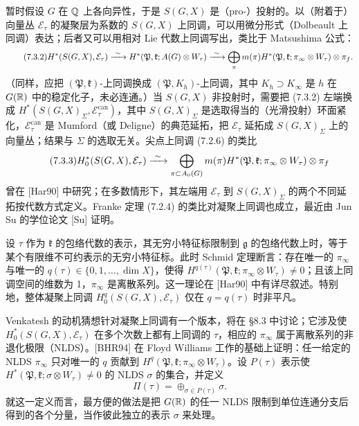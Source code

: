 暂时假设 $G$ 在 $\mathbb{Q}$ 上各向异性，于是 $S(G,X)$ 是（pro-）投射的。以（附着于）向量丛 $\mathcal E_\tau$ 的凝聚层为系数的 $S(G,X)$ 上同调，可以用微分形式（Dolbeault 上同调）表达；后者又可以用相对 Lie 代数上同调写出，类比于 Matsushima 公式：
\begin{equation}\tag{7.3.2}\label{eq:a6-05-2}
H^*(S(G,X),\mathcal E_\tau)\xrightarrow{\ \sim\ } H^*(\mathfrak P,\mathfrak k;A(G)\otimes W_\tau)\xrightarrow{\ \sim\ }\bigoplus_\pi m(\pi)H^*(\mathfrak P,\mathfrak k;\pi_\infty\otimes W_\tau)\otimes\pi_f.
\end{equation}
（同样，应把 $(\mathfrak P,\mathfrak k)$-上同调换成 $(\mathfrak P,K_h)$-上同调，其中 $K_h\supset K_\infty$ 是 $h$ 在 $G(\mathbb{R})$ 中的稳定化子，未必连通。）当 $S(G,X)$ 非投射时，需要把 (7.3.2) 左端换成 $H^*(S(G,X)_\Sigma,\mathcal E_\tau^{\mathrm{can}})$，其中 $S(G,X)_\Sigma$ 是选取得当的（光滑投射）环面紧化，$\mathcal E_\tau^{\mathrm{can}}$ 是 Mumford（或 Deligne）的典范延拓，把 $\mathcal E_\tau$ 延拓成 $S(G,X)_\Sigma$ 上的向量丛；结果与 $\Sigma$ 的选取无关。尖点上同调 (7.2.6) 的类比
\begin{equation}\tag{7.3.3}\label{eq:a6-05-3}
H^*_0(S(G,X),\mathcal E_\tau)\xrightarrow{\ \sim\ }\bigoplus_{\pi\subset A_0(G)}m(\pi)H^*(\mathfrak P,\mathfrak k;\pi_\infty\otimes W_\tau)\otimes\pi_f
\end{equation}
曾在 [Har90] 中研究；在多数情形下，其左端用 $\mathcal E_\tau$ 到 $S(G,X)_\Sigma$ 的两个不同延拓按代数方式定义。Franke 定理 (7.2.4) 的类比对凝聚上同调也成立，最近由 Jun Su 的学位论文 [Su] 证明。

设 $\tau$ 作为 $\mathfrak k$ 的包络代数的表示，其无穷小特征标限制到 $\mathfrak g$ 的包络代数上时，等于某个有限维不可约表示的无穷小特征标。此时 Schmid 定理断言：存在唯一的 $\pi_\infty$ 与唯一的 $q(\tau)\in\{0,1,\dots,\dim X\}$，使得 $H^{q(\tau)}(\mathfrak P,\mathfrak k;\pi_\infty\otimes W_\tau)\ne0$；且该上同调空间的维数为 1，$\pi_\infty$ 是离散系列。这一理论在 [Har90] 中有详尽叙述。特别地，整体凝聚上同调 $H^q_0(S(G,X),\mathcal E_\tau)$ 仅在 $q=q(\tau)$ 时非平凡。

Venkatesh 的动机猜想针对凝聚上同调有一个版本，将在 §8.3 中讨论；它涉及使 $H^*_0(S(G,X),\mathcal E_\tau)$ 在多个次数上都有上同调的 $\tau$，相应的 $\pi_\infty$ 属于离散系列的非退化极限（NLDS）。[BHR94] 在 Floyd Williams 工作的基础上证明：任一给定的 NLDS $\pi_\infty$ 只对唯一的 $q$ 贡献到 $H^q(\mathfrak P,\mathfrak k;\pi_\infty\otimes W_\tau)$。设 $P(\tau)$ 表示使 $H^*(\mathfrak P,\mathfrak k;\sigma\otimes W_\tau)\ne0$ 的 NLDS $\sigma$ 的集合，并定义
\[
\Pi(\tau)=\oplus_{\sigma\in P(\tau)}\sigma.
\]
就这一定义而言，最方便的做法是把 $G(\mathbb{R})$ 的任一 NLDS 限制到单位连通分支后得到的各个分量，当作彼此独立的表示 $\sigma$ 来处理。


